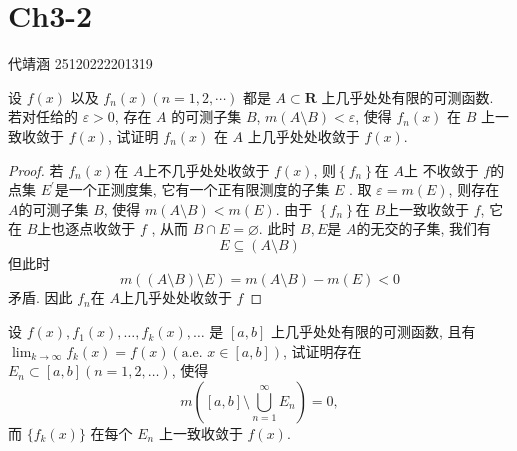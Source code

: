 \documentclass[../main.tex]{subfiles}
\begin{document}
\ifSubfilesClassLoaded{

    
    \setcounter{chapter}{2}
}{}

\chapter{ Ch3-2 }
 代靖涵 25120222201319
\begin{exercise}{}{}
设 $f(x)$ 以及 $f_n(x) (n=1,2,\cdots)$ 都是 $A \subset \mathbf{R}$ 上几乎处处有限的可测函数. 若对任给的 $\varepsilon>0$, 存在 $A$ 的可测子集 $B$, $m(A \setminus B) < \varepsilon$, 使得 $f_n(x)$ 在 $B$ 上一致收敛于 $f(x)$, 试证明 $f_n(x)$ 在 $A$ 上几乎处处收敛于 $f(x)$.
\end{exercise}

\begin{proof}

 若 \(  f_{n}\left( x \right)   \)在 \(  A  \)上不几乎处处收敛于 \(  f\left( x \right)   \), 则\(  \left\{ f_{n} \right\}  \)在 \(  A  \)上 不收敛于 \(  f  \)的点集 \(  E ^{\prime}  \)是一个正测度集, 它有一个正有限测度的子集 \(  E  \) . 取 \(   \varepsilon =m \left( E \right)   \), 则存在 \(  A  \)的可测子集 \(  B  \), 使得 \(  m\left( A\setminus B \right)< m\left( E \right)    \).  由于 \(  \left\{ f_{n} \right\}  \)在 \(  B  \)上一致收敛于 \(  f  \), 它在 \(  B  \)上也逐点收敛于 \(  f  \)   , 从而 \(  B\cap E= \varnothing  \). 此时 \(  B,E  \)是 \(  A  \)的无交的子集,  我们有 \[
E\subseteq \left( A\setminus B \right) 
 \]         
但此时 \[
m\left( \left( A\setminus B \right)\setminus E  \right)= m\left( A\setminus B \right)-m\left( E \right)< 0   
\]矛盾. 因此 \(  f_{n}  \)在 \(  A  \)上几乎处处收敛于 \(  f  \)   
\end{proof}
\begin{exercise}{}{}
设 $f(x), f_1(x), \dots, f_k(x), \dots$ 是 $[a,b]$ 上几乎处处有限的可测函数, 且有 $\lim_{k\to\infty} f_k(x) = f(x) (\text{a.e. } x \in [a,b])$, 试证明存在 $E_n \subset [a,b] (n=1,2,\dots)$, 使得
\[
m\left([a,b] \setminus \bigcup_{n=1}^{\infty} E_n\right) = 0,
\]
而 $\{f_k(x)\}$ 在每个 $E_n$ 上一致收敛于 $f(x)$.
\end{exercise}
\end{document}
